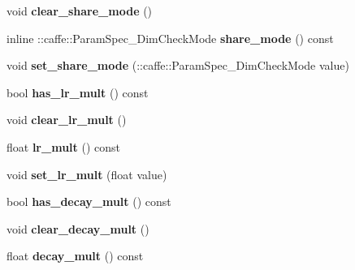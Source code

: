 \begin{DoxyCompactItemize}
\item 
\mbox{\label{classcaffe_1_1_param_spec_a61f27e384e1692bdbe92f8578eed08d6}} 
void {\bfseries clear\+\_\+share\+\_\+mode} ()
\item 
\mbox{\label{classcaffe_1_1_param_spec_a7ce24ed401cddba03d86bc9d06247f36}} 
inline \+::caffe\+::\+Param\+Spec\+\_\+\+Dim\+Check\+Mode {\bfseries share\+\_\+mode} () const
\item 
\mbox{\label{classcaffe_1_1_param_spec_a9c5733a458338239d9ee0b35fe5bf9eb}} 
void {\bfseries set\+\_\+share\+\_\+mode} (\+::caffe\+::\+Param\+Spec\+\_\+\+Dim\+Check\+Mode value)
\item 
\mbox{\label{classcaffe_1_1_param_spec_a3be994a6c73c665f3a99ca5dcc3550b7}} 
bool {\bfseries has\+\_\+lr\+\_\+mult} () const
\item 
\mbox{\label{classcaffe_1_1_param_spec_a4f4a665e43f6b709764109aa3f0d6898}} 
void {\bfseries clear\+\_\+lr\+\_\+mult} ()
\item 
\mbox{\label{classcaffe_1_1_param_spec_ab5d8f850e5223c554f5235521badf0ae}} 
float {\bfseries lr\+\_\+mult} () const
\item 
\mbox{\label{classcaffe_1_1_param_spec_af414631f85cb8a877b4a9a0c80be90ff}} 
void {\bfseries set\+\_\+lr\+\_\+mult} (float value)
\item 
\mbox{\label{classcaffe_1_1_param_spec_a0518b412f7cc84426bb4d813d61f6c9e}} 
bool {\bfseries has\+\_\+decay\+\_\+mult} () const
\item 
\mbox{\label{classcaffe_1_1_param_spec_a937159ef0843638ee3b83684e75bcfb6}} 
void {\bfseries clear\+\_\+decay\+\_\+mult} ()
\item 
\mbox{\label{classcaffe_1_1_param_spec_aa91251c4a07b71374c4c0d29c6c2740a}} 
float {\bfseries decay\+\_\+mult} () const
\item 
\mbox{\label{classcaffe_1_1_param_spec_a8f2397c33a6f3745d3b2d34cefec08af}} 

\end{DoxyCompactItemize}
